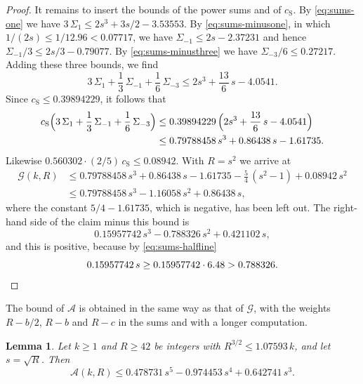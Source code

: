 \documentclass{amsart}
\makeatletter
\newtheorem{lemma}[theorem]{Lemma}
\theoremstyle{definition}
\theoremstyle{remark}
\numberwithin{equation}{section}
\def\subsection{\@startsection{subsection}{2}\z@{.5\linespacing\@plus.7\linespacing}{-.5em}{\normalfont\bfseries\boldmath}}
\makeatother
\begin{document}
\begin{proof}
It remains to insert the bounds of the power sums and of $c_{\mathrm S}$.
By \eqref{eq:sums-one} we have $3\,\Sigma_1\le2s^3+3s/2-3.53553$. By
\eqref{eq:sums-minusone}, in which $1/(2s)\le1/12.96<0.07717$, we have
$\Sigma_{-1}\le2s-2.37231$ and hence $\Sigma_{-1}/3\le2s/3-0.79077$. By
\eqref{eq:sums-minusthree} we have $\Sigma_{-3}/6\le0.27217$. Adding these
three bounds, we find
\[
3\,\Sigma_1+\frac13\,\Sigma_{-1}+\frac16\,\Sigma_{-3}
\le2s^3+\frac{13}6\,s-4.0541 .
\]
Since $c_{\mathrm S}\le0.39894229$, it follows that
\begin{align*}
c_{\mathrm S}\Bigl(3\,\Sigma_1+\frac13\,\Sigma_{-1}
+\frac16\,\Sigma_{-3}\Bigr)
&\le0.39894229\,\Bigl(2s^3+\frac{13}6\,s-4.0541\Bigr)\\
&\le0.79788458\,s^3+0.86438\,s-1.61735 .
\end{align*}
Likewise $0.560302\cdot(2/5)\,c_{\mathrm S}\le0.08942$. With $R=s^2$ we
arrive at
\begin{align*}
\mathcal G(k,R)
&\le0.79788458\,s^3+0.86438\,s-1.61735-\frac54\,(s^2-1)+0.08942\,s^2\\
&\le0.79788458\,s^3-1.16058\,s^2+0.86438\,s ,
\end{align*}
where the constant $5/4-1.61735$, which is negative, has been left out. The
right-hand side of the claim minus this bound is
\[
0.15957742\,s^3-0.788326\,s^2+0.421102\,s ,
\]
and this is positive, because by \eqref{eq:sums-halfline}
\[
0.15957742\,s\ge0.15957742\cdot6.48>0.788326 .\qedhere
\]
\end{proof}

\subsection{The sum $\mathcal A$}\label{subsec:sums-excess}

The bound of $\mathcal A$ is obtained in the same way as that of
$\mathcal G$, with the weights $R-b/2$, $R-b$ and $R-c$ in the sums and with
a longer computation.

\begin{lemma}\label{lem:excessupper}
Let $k\ge1$ and $R\ge42$ be integers with $R^{3/2}\le1.07593\,k$, and let
$s=\sqrt R$. Then
\[
\mathcal A(k,R)\le0.478731\,s^5-0.974453\,s^4+0.642741\,s^3 .
\]
\end{lemma}
\end{document}

